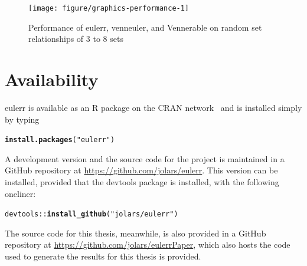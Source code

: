 \documentclass[
  oneside,
  openany,
  numbers=noendperiod,
  parskip=half,
  bibliography=totoc
]{scrbook}\usepackage[]{graphicx}\usepackage{xcolor}
\makeatletter
\newcommand{\hlstr}[1]{\textcolor[rgb]{0.192,0.494,0.8}{#1}}%
\newcommand{\hlopt}[1]{\textcolor[rgb]{0,0,0}{#1}}%
\newcommand{\hlstd}[1]{\textcolor[rgb]{0.345,0.345,0.345}{#1}}%
\newcommand{\hlkwd}[1]{\textcolor[rgb]{0.737,0.353,0.396}{\textbf{#1}}}%
\newenvironment{kframe}{%
 \def\at@end@of@kframe{}%
 \ifinner\ifhmode%
  \def\at@end@of@kframe{\end{minipage}}%
  \begin{minipage}{\columnwidth}%
 \fi\fi%
 \def\FrameCommand##1{\hskip\@totalleftmargin \hskip-\fboxsep
 \colorbox{shadecolor}{##1}\hskip-\fboxsep
     \hskip-\linewidth \hskip-\@totalleftmargin \hskip\columnwidth}%
 \MakeFramed {\advance\hsize-\width
   \@totalleftmargin\z@ \linewidth\hsize
   \@setminipage}}%
 {\par\unskip\endMakeFramed%
 \at@end@of@kframe}
\newenvironment{knitrout}{}{} %
\newcommand{\pkg}[1]{{\fontseries{b}\selectfont #1}}
\makeatother
\begin{document}
\begin{figure}[hbtp]
\begin{knitrout}\small
{}\color{fgcolor}

{\centering \texttt{[image: figure/graphics-performance-1]} 

}



\end{knitrout}
\caption{Performance of \pkg{eulerr}, \pkg{venneuler}, and \pkg{Vennerable} on
random set relationships of 3 to 8 sets }
\label{fig:performance}
\end{figure}

\section{Availability}\label{sec:availability}

\pkg{eulerr} is available as an R package on the CRAN network~\citep{RCT_2017a}
and is installed simply by typing

\begin{knitrout}\small
{}\color{fgcolor}\begin{kframe}
\begin{alltt}
\hlkwd{install.packages}\hlstd{(}\hlstr{"eulerr"}\hlstd{)}
\end{alltt}
\end{kframe}
\end{knitrout}

A development version and the source code for the project is maintained in
a GitHub repository at
\url{https://github.com/jolars/eulerr}. This version
can be installed, provided that the \pkg{devtools} package is installed,
with the following oneliner:

\begin{knitrout}\small
{}\color{fgcolor}\begin{kframe}
\begin{alltt}
\hlstd{devtools}\hlopt{::}\hlkwd{install_github}\hlstd{(}\hlstr{"jolars/eulerr"}\hlstd{)}
\end{alltt}
\end{kframe}
\end{knitrout}

The source code for this thesis, meanwhile, is also provided in a GitHub
repository at
\url{https://github.com/jolars/eulerrPaper},
which also hosts the code used to generate the results for this thesis is
provided.
\end{document}
